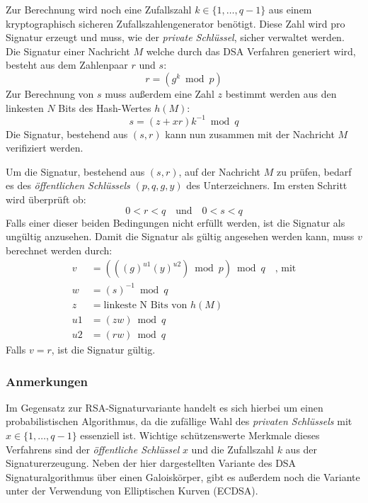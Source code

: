 \documentclass[11pt,a4paper,ngerman]{scrreprt}
\begin{document}
\begin{description}[font=\rmfamily]
    Zur Berechnung wird noch eine Zufallszahl $k \in \{ 1, \ldots, q - 1 \}$ aus einem kryptographisch sicheren Zufallszahlengenerator benötigt. Diese Zahl wird pro Signatur erzeugt und muss, wie der \emph{private Schlüssel}, sicher verwaltet werden. Die Signatur einer Nachricht $M$ welche durch das DSA Verfahren generiert wird, besteht aus dem Zahlenpaar $r$ und $s$:
    \[
        r = (g^k \bmod p)
    \]
    Zur Berechnung von $s$ muss außerdem eine Zahl $z$ bestimmt werden aus den linkesten $N$ Bits des Hash-Wertes $h(M)$:
    \[
        s = (z + xr)k^{-1} \bmod q
    \]
    Die Signatur, bestehend aus $(s, r)$ kann nun zusammen mit der Nachricht $M$ verifiziert werden.
    \item[Signaturverifikation:] Um die Signatur, bestehend aus $(s, r)$, auf der Nachricht $M$ zu prüfen, bedarf es des \emph{öffentlichen Schlüssels} $(p, q, g, y)$ des Unterzeichners. Im ersten Schritt wird überprüft ob: 
    \[
        0 < r < q \quad\textrm{und}\quad 0 < s < q
    \]
    Falls einer dieser beiden Bedingungen nicht erfüllt werden, ist die Signatur als ungültig anzusehen. Damit die Signatur als gültig angesehen werden kann, muss $v$ berechnet werden durch:
    \begin{align*}
        v& = (((g)^{u1}(y)^{u2}) \bmod p) \bmod q \quad\textrm{, mit}\\
        w& = (s)^{-1} \bmod q \\
        z& = \textrm{linkeste N Bits von $h(M)$} \\
        u1& = (zw) \bmod q \\
        u2& = (rw) \bmod q
    \end{align*}
    Falls $v = r$, ist die Signatur gültig.
    \subsubsection{Anmerkungen}
    Im Gegensatz zur RSA-Signaturvariante handelt es sich hierbei um einen probabilistischen Algorithmus, da die zufällige Wahl des \emph{privaten Schlüssels} mit $x \in \{1, \ldots, q - 1 \}$ essenziell ist. Wichtige schützenswerte Merkmale dieses Verfahrens sind der \emph{öffentliche Schlüssel} $x$ und die Zufallszahl $k$ aus der Signaturerzeugung. Neben der hier dargestellten Variante des DSA Signaturalgorithmus über einen Galoiskörper, gibt es außerdem noch die Variante unter der Verwendung von Elliptischen Kurven (ECDSA).
\end{description}
\end{document}
